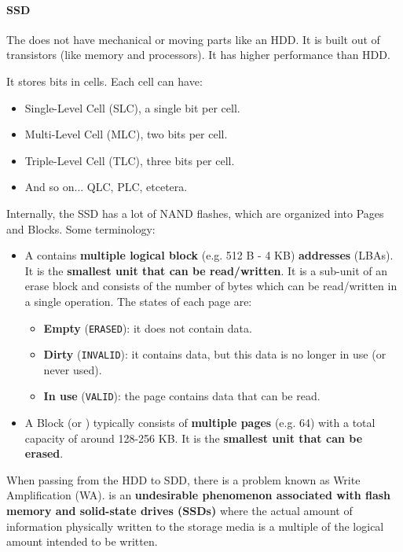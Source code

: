 \newpage

\paragraph{SSD}\label{paragraph: SSD}

The  does not have mechanical or moving parts like an HDD. It is built out of transistors (like memory and processors). It has higher performance than HDD.

\highspace
It stores bits in cells. Each cell can have:
\begin{itemize}
    \item Single-Level Cell (SLC), a single bit per cell.
    \item Multi-Level Cell (MLC), two bits per cell.
    \item Triple-Level Cell (TLC), three bits per cell.
    \item And so on... QLC, PLC, etcetera.
\end{itemize}
Internally, the SSD has a lot of NAND flashes, which are organized into Pages and Blocks. Some terminology:
\begin{itemize}
    \item A  contains \textbf{multiple logical block} (e.g. 512 B - 4 KB) \textbf{addresses} (LBAs). It is the \textbf{smallest unit that can be read/written}. It is a sub-unit of an erase block and consists of the number of bytes which can be read/written in a single operation. The states of each page are:
    \begin{itemize}
        \item {} \textbf{Empty} (\texttt{ERASED}): it does not contain data.
        \item {} \textbf{Dirty} (\texttt{INVALID}): it contains data, but this data is no longer in use (or never used).
        \item {} \textbf{In use} (\texttt{VALID}): the page contains data that can be read.
    \end{itemize}

    \item A Block (or ) typically consists of \textbf{multiple pages} (e.g. 64) with a total capacity of around 128-256 KB. It is the \textbf{smallest unit that can be erased}.
\end{itemize}

\highspace
When passing from the HDD to SDD, there is a problem known as Write Amplification (WA). \label{Write amplification (WA)} is an \textbf{undesirable phenomenon associated with flash memory and solid-state drives (SSDs)} where the actual amount of information physically written to the storage media is a multiple of the logical amount intended to be written.

